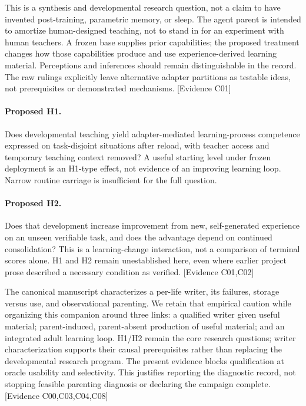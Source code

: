 \documentclass[11pt]{article}
\newcommand{\ev}[1]{\textsf{[Evidence #1]}}
\begin{document}
This is a synthesis and developmental research question, not a claim to have
invented post-training, parametric memory, or sleep. The agent parent is intended
to amortize human-designed teaching, not to stand in for an experiment with human
teachers. A frozen base supplies prior capabilities; the proposed treatment
changes how those capabilities produce and use experience-derived learning
material. Perceptions and inferences should remain distinguishable in the record.
The raw rulings explicitly leave alternative adapter partitions as testable ideas,
not prerequisites or demonstrated mechanisms. \ev{C01}

\paragraph{Proposed H1.} Does developmental teaching yield adapter-mediated
learning-process competence expressed on task-disjoint situations after reload,
with teacher access and temporary teaching context removed? A useful starting
level under frozen deployment is an H1-type effect, not evidence of an improving
learning loop. Narrow routine carriage is insufficient for the full question.

\paragraph{Proposed H2.} Does that development increase improvement from new,
self-generated experience on an unseen verifiable task, and does the advantage
depend on continued consolidation? This is a learning-change interaction, not a
comparison of terminal scores alone. H1 and H2 remain unestablished here, even
where earlier project prose described a necessary condition as verified. \ev{C01,C02}

The canonical manuscript characterizes a per-life writer, its failures, storage
versus use, and observational parenting. We retain that empirical caution while
organizing this companion around three links: a qualified writer given useful
material; parent-induced, parent-absent production of useful material; and an
integrated adult learning loop. H1/H2 remain the core research questions; writer
characterization supports their causal prerequisites rather than replacing the
developmental research program. The present evidence blocks qualification at
oracle usability and selectivity. This justifies reporting the diagnostic record,
not stopping feasible parenting diagnosis or declaring the campaign complete.
\ev{C00,C03,C04,C08}
\end{document}
